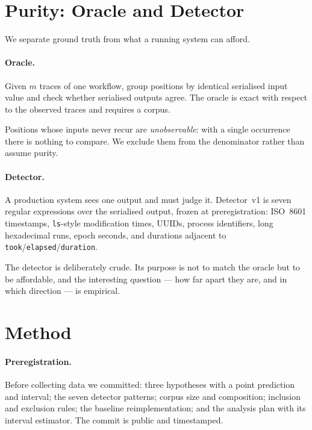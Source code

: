 \documentclass[10pt,conference]{article}
\begin{document}
\section{Purity: Oracle and Detector}
\label{sec:purity}

\figTwoGates{}

We separate ground truth from what a running system can afford.

\paragraph{Oracle.} Given $m$ traces of one workflow, group positions by
identical serialised input value and check whether serialised outputs agree. The
oracle is exact with respect to the observed traces and requires a corpus.

Positions whose inputs never recur are \emph{unobservable}: with a single
occurrence there is nothing to compare. We exclude them from the denominator
rather than assume purity.

\paragraph{Detector.} A production system sees one output and must judge it.
Detector~v1 is seven regular expressions over the serialised output, frozen at
preregistration: ISO~8601 timestamps, \texttt{ls}-style modification times,
UUIDs, process identifiers, long hexadecimal runs, epoch seconds, and durations
adjacent to \texttt{took}/\texttt{elapsed}/\texttt{duration}.

The detector is deliberately crude. Its purpose is not to match the oracle but
to be affordable, and the interesting question --- how far apart they are, and
in which direction --- is empirical.

\section{Method}
\label{sec:method}

\paragraph{Preregistration.} Before collecting data we committed: three
hypotheses with a point prediction and interval; the seven detector patterns;
corpus size and composition; inclusion and exclusion rules; the baseline
reimplementation; and the analysis plan with its interval estimator. The commit
is public and timestamped.
\end{document}
